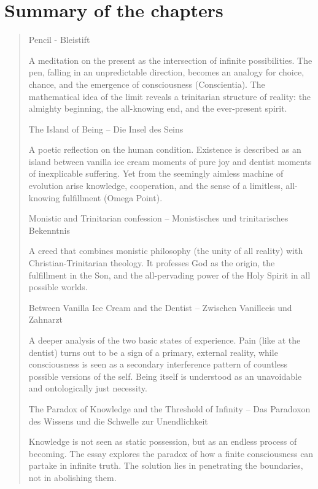 \documentclass[
  ngerman,
]{article}
\begin{document}
\section{\texorpdfstring{\textbf{Summary of the
chapters}}{Summary of the chapters}}\label{summary-of-the-chapters}

\begin{quote}
Pencil - Bleistift

A meditation on the present as the intersection of infinite
possibilities. The pen, falling in an unpredictable direction, becomes
an analogy for choice, chance, and the emergence of consciousness
(Conscientia). The mathematical idea of the limit reveals a trinitarian
structure of reality: the almighty beginning, the all-knowing end, and
the ever-present spirit.

The Island of Being -- Die Insel des Seins

A poetic reflection on the human condition. Existence is described as an
island between \textquotesingle vanilla ice cream
moments\textquotesingle{} of pure joy and \textquotesingle dentist
moments\textquotesingle{} of inexplicable suffering. Yet from the
seemingly aimless machine of evolution arise knowledge, cooperation, and
the sense of a limitless, all-knowing fulfillment (Omega Point).

Monistic and Trinitarian confession -- Monistisches und trinitarisches
Bekenntnis

A creed that combines monistic philosophy (the unity of all reality)
with Christian-Trinitarian theology. It professes God as the origin, the
fulfillment in the Son, and the all-pervading power of the Holy Spirit
in all possible worlds.

Between Vanilla Ice Cream and the Dentist -- Zwischen Vanilleeis und
Zahnarzt

A deeper analysis of the two basic states of experience. Pain (like at
the dentist) turns out to be a sign of a primary, external reality,
while consciousness is seen as a secondary interference pattern of
countless possible versions of the self. Being itself is understood as
an unavoidable and \textquotesingle ontologically just\textquotesingle{}
necessity.

The Paradox of Knowledge and the Threshold of Infinity -- Das Paradoxon
des Wissens und die Schwelle zur Unendlichkeit

Knowledge is not seen as static possession, but as an endless process of
becoming. The essay explores the paradox of how a finite consciousness
can partake in infinite truth. The solution lies in penetrating the
boundaries, not in abolishing them.


\end{quote}
\end{document}
